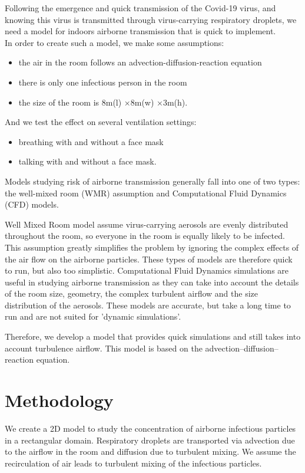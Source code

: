 \documentclass{article}
\begin{document}
Following the emergence and quick transmission of the Covid-19 virus, and knowing this virus is transmitted through virus-carrying respiratory droplets, we need a model for indoors airborne transmission that is quick to implement. \\
In order to create such a model, we make some assumptions:
\begin{itemize}
    \item the air in the room follows an advection-diffusion-reaction equation
    \item there is only one infectious person in the room
    \item the size of the room is 8m(l) ×8m(w) ×3m(h). 
\end{itemize}
And we test the effect on several ventilation settings:
\begin{itemize}
    \item breathing with and without a face mask
    \item talking with and without a face mask.
\end{itemize}

Models studying risk of airborne transmission generally fall into one of two types: the well-mixed room (WMR) assumption and Computational Fluid Dynamics (CFD) models.

Well Mixed Room model assume virus-carrying aerosols are evenly distributed throughout the room, so everyone in the room is equally likely to be infected. This assumption greatly simplifies the problem by ignoring the complex effects of the air flow on the airborne particles. These types of models are therefore quick to run, but also too simplistic.
Computational Fluid Dynamics simulations are useful in studying airborne transmission as they can take into account the details of the room size, geometry, the complex turbulent airflow and the size distribution of the aerosols. These models are accurate, but take a long time to run and are not suited for 'dynamic  simulations'.

Therefore, we develop a model that provides quick simulations and still takes into account turbulence airflow.
This model is based on the advection–diffusion–reaction equation.

\section*{Methodology}

We create a  2D  model  to  study  the  concentration  of  airborne  infectious  particles  in  a rectangular domain.
Respiratory droplets are transported via advection due to the airflow in the room and diffusion due to turbulent mixing. We assume the recirculation of air leads to turbulent mixing of the infectious particles.
\end{document}
